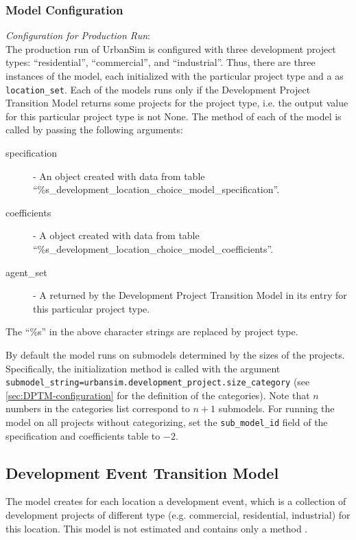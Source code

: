 \subsubsection{Model Configuration}
\modelsindex
%
{\em Configuration for Production Run}:\\[1mm]
The production run of UrbanSim is configured with three development project
types: ``residential'', ``commercial'', and ``industrial''. Thus, there are
three instances of the model, \modelsindex each initialized with the particular project
type and a  as \verb|location_set|.  Each of the models \modelsindex
runs only if the Development Project Transition Model \modelsindex returns some projects
for the project type, i.e. the output value for this particular project type
is not None.  The  method of each of the model \modelsindex is called by
passing the following arguments:
\begin{description}
\item[specification] - An
 object created with data from table
``\%s_development_location_choice_model_specification''.  \modelsindex
\item[coefficients] \coefficientsindex - A  \coefficientsindex object created
with data from table ``\%s_development_location_choice_model_coefficients''. \coefficientsindex\modelsindex
\item[agent_set] - A  returned by the Development
  Project Transition Model \modelsindex in its entry for this particular project type.
\end{description}
The ``\%s'' in the above character strings are replaced by project type.

By default the model runs on submodels determined by the sizes of the projects. Specifically,
the initialization method is called with the argument \verb|submodel_string=urbansim.development_project.size_category|
(see \ref{sec:DPTM-configuration} for the definition of the categories). Note that $n$ numbers in
the categories list correspond to $n+1$ submodels. For running the model on all projects without categorizing, 
set the \verb|sub_model_id| field of the specification and coefficients table to $-2$.

%
\subsection{Development Event Transition Model}
\modelsindex
%
\label{sec:development-event-transition-model}
%
The model \modelsindex creates for each location a development event, which is a collection
of development projects of different type (e.g. commercial, residential,
industrial) for this location. This model \modelsindex is not estimated and contains only a
method .

